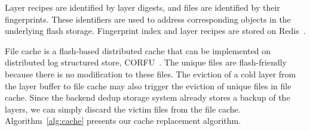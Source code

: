 Layer recipes are identified by layer digests, and files are identified by their fingerprints.
These identifiers are used to address corresponding objects in the underlying flash storage. 
Fingerprint index and layer recipes are stored on Redis~\cite{redis}.

File cache is a flash-based distributed cache that can be implemented on 
distributed log structured store, \eg CORFU~\cite{180277}.
The unique files are flash-friendly because there is no modification to these files.
%
%
The eviction of a cold layer from the layer buffer to file cache
 may also trigger the eviction of unique files in file cache.
Since the backend dedup storage system already stores a backup of the layers, 
we can simply discard the victim files from the file cache. Algorithm~\ref{alg:cache} presents our 
cache replacement algorithm.

